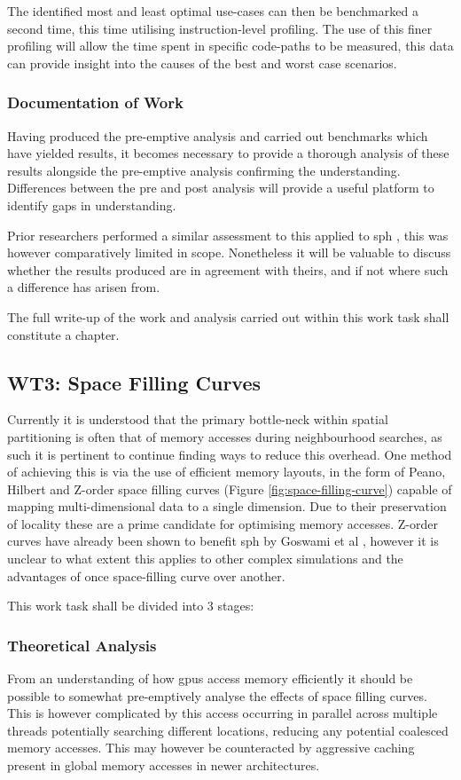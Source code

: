         The identified most and least optimal use-cases can then be benchmarked a second time, this time utilising instruction-level profiling. The use of this finer profiling will allow the time spent in specific code-paths to be measured, this data can provide insight into the causes of the best and worst case scenarios.
      
      \subsubsection*{Documentation of Work}
        Having produced the pre-emptive analysis and carried out benchmarks which have yielded results, it becomes necessary to provide a thorough analysis of these results alongside the pre-emptive analysis confirming the understanding. Differences between the pre and post analysis will provide a useful platform to identify gaps in understanding.
        
        Prior researchers performed a similar assessment to this applied to \gls{sph} \cite{Hoe14}, this was however comparatively limited in scope. Nonetheless it will be valuable to discuss whether the results produced are in agreement with theirs, and if not where such a difference has arisen from.
        
        The full write-up of the work and analysis carried out within this work task shall constitute a chapter.
      
    \subsection{WT3: Space Filling Curves}
      Currently it is understood that the primary bottle-neck within spatial partitioning is often that of memory accesses during neighbourhood searches, as such it is pertinent to continue finding ways to reduce this overhead. One method of achieving this is via the use of efficient memory layouts, in the form of Peano, Hilbert and Z-order space filling curves (Figure \ref{fig:space-filling-curve}) capable of mapping multi-dimensional data to a single dimension. Due to their preservation of locality these are a prime candidate for optimising memory accesses. Z-order curves have already been shown to benefit \gls{sph} by Goswami et al \cite{GS*10}, however it is unclear to what extent this applies to other complex simulations and the advantages of once space-filling curve over another.
      
      This work task shall be divided into 3 stages:
      \subsubsection*{Theoretical Analysis}
        From an understanding of how \glspl{gpu} access memory efficiently it should be possible to somewhat pre-emptively analyse the effects of space filling curves. This is however complicated by this access occurring in parallel across multiple threads potentially searching different locations, reducing any potential coalesced memory accesses. This may however be counteracted by aggressive caching present in global memory accesses in newer architectures.
        
